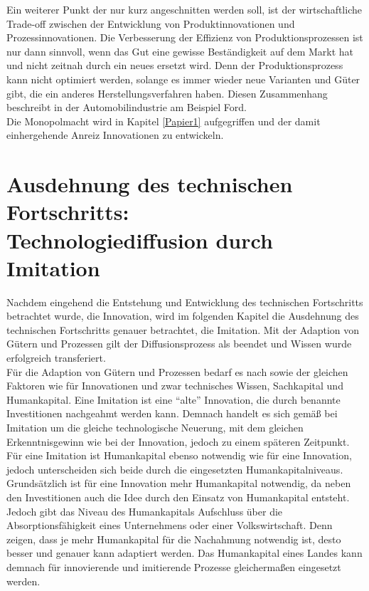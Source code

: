 %
Ein weiterer Punkt der nur kurz angeschnitten werden soll, ist der wirtschaftliche Trade-off zwischen der Entwicklung von Produktinnovationen und Prozessinnovationen. Die Verbesserung der Effizienz von Produktionsprozessen ist nur dann sinnvoll, wenn das Gut eine gewisse Beständigkeit auf dem Markt hat und nicht zeitnah durch ein neues ersetzt wird. Denn der Produktionsprozess kann nicht optimiert werden, solange es immer wieder neue Varianten und Güter gibt, die ein anderes Herstellungsverfahren haben. Diesen Zusammenhang beschreibt \cite{Abernathy.1978} in der Automobilindustrie am Beispiel Ford.\\
%
Die Monopolmacht wird in Kapitel \ref{Papier1} aufgegriffen und der damit einhergehende  Anreiz Innovationen zu entwickeln. 
%
\section[Technologiediffusion durch Imitation]{Ausdehnung des technischen Fortschritts:\\Technologiediffusion durch Imitation}
%
Nachdem eingehend die Entstehung und Entwicklung des technischen Fortschritts betrachtet wurde, die Innovation, wird im folgenden Kapitel die Ausdehnung des technischen Fortschritts genauer betrachtet, die Imitation. Mit der Adaption von Gütern und Prozessen gilt der Diffusionsprozess als beendet und Wissen wurde erfolgreich transferiert. \\
%
Für die Adaption von Gütern und Prozessen bedarf es nach \cite{Cohen.1989} sowie \cite{Griffith.2004} der gleichen Faktoren wie für Innovationen und zwar technisches Wissen, Sachkapital und Humankapital. Eine Imitation ist eine "`alte"' Innovation, die durch benannte Investitionen nachgeahmt werden kann. Demnach handelt es sich gemäß \cite{Schmookler.1966} bei Imitation um die gleiche technologische Neuerung, mit dem gleichen Erkenntnisgewinn wie bei der Innovation, jedoch zu einem späteren Zeitpunkt. Für eine Imitation ist Humankapital ebenso notwendig wie für eine Innovation, jedoch unterscheiden sich beide durch die eingesetzten Humankapitalniveaus. Grundsätzlich ist für eine Innovation mehr Humankapital notwendig, da neben den Investitionen auch die Idee durch den Einsatz von Humankapital entsteht. Jedoch gibt das Niveau des Humankapitals Aufschluss über die Absorptionsfähigkeit eines Unternehmens oder einer Volkswirtschaft. Denn \cite{Nelson.1966} zeigen, dass je mehr Humankapital für die Nachahmung notwendig ist, desto besser und genauer kann adaptiert werden. Das Humankapital eines Landes kann demnach für innovierende und imitierende Prozesse gleichermaßen eingesetzt werden. \\
